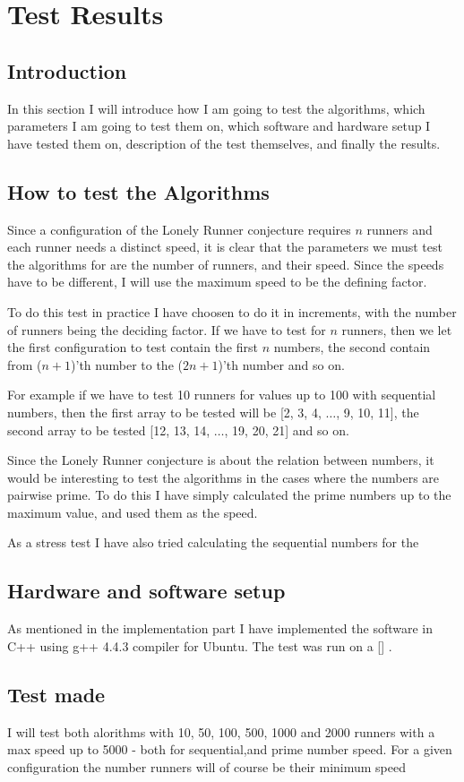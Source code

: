 \section{Test Results}
\label{test}

\subsection{Introduction}
In this section I will introduce how I am going to test the algorithms, which parameters I am going to test them on, which software and hardware setup I have tested them on, description of the test themselves, and finally the results.

\subsection{How to test the Algorithms}
Since a configuration of the Lonely Runner conjecture requires $n$ runners and each runner needs a distinct speed, it is clear that the parameters we must test the algorithms for are the number of runners, and their speed. Since the speeds have to be different, I will use the maximum speed to be the defining factor.

To do this test in practice I have choosen to do it in increments, with the number of runners being the deciding factor. If we have to test for $n$ runners, then we let the first configuration to test contain the first $n$ numbers, the second contain from ($n+1$)'th number to the ($2n+1$)'th number and so on.

For example if we have to test 10 runners for values up to 100 with sequential numbers, then the first array to be tested will be [2, 3, 4, $\ldots$, 9, 10, 11], the second array to be tested [12, 13, 14, $\ldots$, 19, 20, 21] and so on.

Since the Lonely Runner conjecture is about the relation between numbers, it would be interesting to test the algorithms in the cases where the numbers are pairwise prime. To do this I have simply calculated the prime numbers up to the maximum value, and used them as the speed.

As a stress test I have also tried calculating the sequential numbers for the 

\subsection{Hardware and software setup}
As mentioned in the implementation part I have implemented the software in C++ using g++ 4.4.3 compiler for Ubuntu. The test was run on a [] .

\subsection{Test made} 

I will test both alorithms with 10, 50, 100, 500, 1000 and 2000 runners with a max speed up to 5000 - both for sequential,and prime number speed. For a given configuration the number runners will of course be their minimum speed
